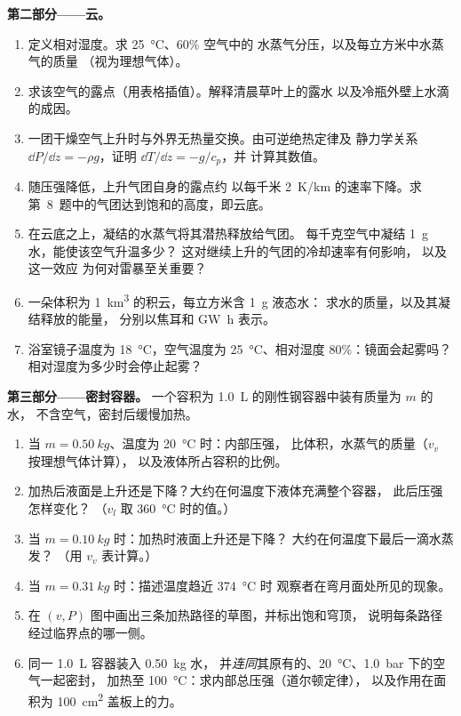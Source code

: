 \begin{problem}
\medskip
\noindent\textbf{第二部分——云。}
\begin{enumerate}[resume]
  \item 定义相对湿度。求 \qty{25}{\degreeCelsius}、$60\%$ 空气中的
        水蒸气分压，以及每立方米中水蒸气的质量
        （视为理想气体）。
  \item 求该空气的露点（用表格插值）。解释清晨草叶上的露水
        以及冷瓶外壁上水滴的成因。
  \item 一团干燥空气上升时与外界无热量交换。由可逆绝热定律及
        静力学关系
        $\dd P/\dd z = -\rho g$，证明 $\dd T/\dd z = -g/c_p$，并
        计算其数值。
  \item 随压强降低，上升气团自身的露点约
        以每千米 \qty{2}{K/km} 的速率下降。求
        第~8~题中的气团达到饱和的高度，即云底。
  \item 在云底之上，凝结的水蒸气将其潜热释放给气团。
        每千克空气中凝结 \qty{1}{g} 水，能使该空气升温多少？
        这对继续上升的气团的冷却速率有何影响，
        以及这一效应
        为何对雷暴至关重要？
  \item 一朵体积为 \qty{1}{km^3} 的积云，每立方米含 \qty{1}{g} 液态水：
        求水的质量，以及其凝结释放的能量，
        分别以焦耳和 \unit{GW h} 表示。
  \item 浴室镜子温度为 \qty{18}{\degreeCelsius}，空气温度为
        \qty{25}{\degreeCelsius}、相对湿度 $80\%$：镜面会起雾吗？
        相对湿度为多少时会停止起雾？
\end{enumerate}

\medskip
\noindent\textbf{第三部分——密封容器。}
一个容积为 \qty{1.0}{L} 的刚性钢容器中装有质量为 $m$ 的水，
不含空气，密封后缓慢加热。
\begin{enumerate}[resume]
  \item 当 $m = \qty{0.50}{kg}$、温度为 \qty{20}{\degreeCelsius} 时：内部压强，
        比体积，水蒸气的质量（$v_v$ 按理想气体计算），
        以及液体所占容积的比例。
  \item 加热后液面是上升还是下降？大约在何温度下液体充满整个容器，
        此后压强怎样变化？
        （$v_l$ 取 \qty{360}{\degreeCelsius} 时的值。）
  \item 当 $m = \qty{0.10}{kg}$ 时：加热时液面上升还是下降？
        大约在何温度下最后一滴水蒸发？
        （用 $v_v$ 表计算。）
  \item 当 $m = \qty{0.31}{kg}$ 时：描述温度趋近 \qty{374}{\degreeCelsius} 时
        观察者在弯月面处所见的现象。
  \item 在 $(v, P)$ 图中画出三条加热路径的草图，并标出饱和穹顶，
        说明每条路径
        经过临界点的哪一侧。
  \item 同一 \qty{1.0}{L} 容器装入 \qty{0.50}{kg} 水，
        并\emph{连同}其原有的、\qty{20}{\degreeCelsius}、\qty{1.0}{bar} 下的空气一起密封，
        加热至 \qty{100}{\degreeCelsius}：求内部总压强（道尔顿定律），
        以及作用在面积为 \qty{100}{cm^2} 盖板上的力。
\end{enumerate}


\end{problem}
